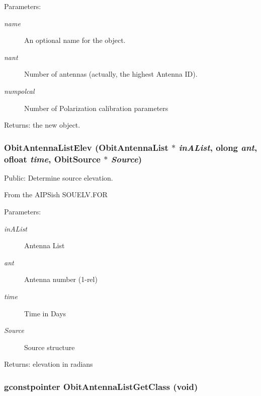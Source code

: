 \begin{Desc}
\item[Parameters:]
\begin{description}
\item[{\em name}]An optional name for the object. \item[{\em nant}]Number of antennas (actually, the highest Antenna ID). \item[{\em numpolcal}]Number of Polarization calibration parameters \end{description}
\end{Desc}
\begin{Desc}
\item[Returns:]the new object. \end{Desc}
\subsubsection{ Obit\-Antenna\-List\-Elev ({\bf Obit\-Antenna\-List} $\ast$ {\em in\-AList}, {\bf olong} {\em ant}, {\bf ofloat} {\em time}, {\bf Obit\-Source} $\ast$ {\em Source})}\label{ObitAntennaList_8h_a15}


Public: Determine source elevation. 

From the AIPSish SOUELV.FOR \begin{Desc}
\item[Parameters:]
\begin{description}
\item[{\em in\-AList}]Antenna List \item[{\em ant}]Antenna number (1-rel) \item[{\em time}]Time in Days \item[{\em Source}]Source structure \end{description}
\end{Desc}
\begin{Desc}
\item[Returns:]elevation in radians \end{Desc}
\subsubsection{\setlength{\rightskip}{0pt plus 5cm}gconstpointer Obit\-Antenna\-List\-Get\-Class (void)}\label{ObitAntennaList_8h_a11}


